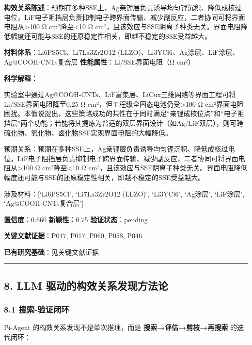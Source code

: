 \documentclass[12pt,a4paper]{ctexart}
\begin{document}
\textbf{构效关系陈述}：预期在多种SSE上，Ag亲锂层负责诱导均匀锂沉积、降低成核过电位，LiF电子阻挡层负责抑制电子跨界面传输、减少副反应，二者协同可将界面电阻从\textgreater100 Ω cm²降至\textless10 Ω cm²，且该效应与SSE阴离子种类无关。界面电阻降低幅度还可能与SSE的还原稳定性相关，即越不稳定的SSE受益越大。

\textbf{材料体系}：Li6PS5Cl、Li7La3Zr2O12 (LLZO)、Li3YCl6、Ag涂层、LiF涂层、Ag@COOH-CNTs复合层 \textbar{} \textbf{性能属性}：Li/SSE界面电阻（Ω cm²）

\textbf{科学解释}：

实验室中通过Ag@COOH-CNTs、LiF富集层、LiCux三维网络等界面工程可将Li/SSE界面电阻降至0.25 Ω cm²，但工程级全固态电池仍受\textgreater100 Ω cm²界面电阻困扰。本假说提出，这些策略成功的共性在于同时满足``亲锂成核位点''和``电子阻挡层''两个功能；若能将其提炼为普适的双层界面设计（如Ag/LiF双层），则可跨硫化物、氧化物、卤化物SSE实现界面电阻的大幅降低。

预期关系：预期在多种SSE上，Ag亲锂层负责诱导均匀锂沉积、降低成核过电位，LiF电子阻挡层负责抑制电子跨界面传输、减少副反应，二者协同可将界面电阻从\textgreater100 Ω cm²降至\textless10 Ω cm²，且该效应与SSE阴离子种类无关。界面电阻降低幅度还可能与SSE的还原稳定性相关，即越不稳定的SSE受益越大。

涉及材料：{[}`Li6PS5Cl', `Li7La3Zr2O12 (LLZO)', `Li3YCl6', `Ag涂层', `LiF涂层', `Ag@COOH-CNTs复合层'{]}

\textbf{置信度}：0.660 \textbar{} \textbf{新颖性}：0.75 \textbar{} \textbf{验证状态}：pending

\textbf{关键文献证据}：P047, P017, P060, P058, P046

\textbf{已有研究基础}：见关键文献证据

\begin{center}\rule{0.5\linewidth}{0.5pt}\end{center}

\subsection{8. LLM 驱动的构效关系发现方法论}\label{llm-ux9a71ux52a8ux7684ux6784ux6548ux5173ux7cfbux53d1ux73b0ux65b9ux6cd5ux8bba}

\subsubsection{8.1 搜索-验证闭环}\label{ux641cux7d22-ux9a8cux8bc1ux95edux73af}

Pi-Agent 的构效关系发现不是单次推理，而是 \textbf{搜索→评估→剪枝→再搜索} 的迭代闭环：
\end{document}
